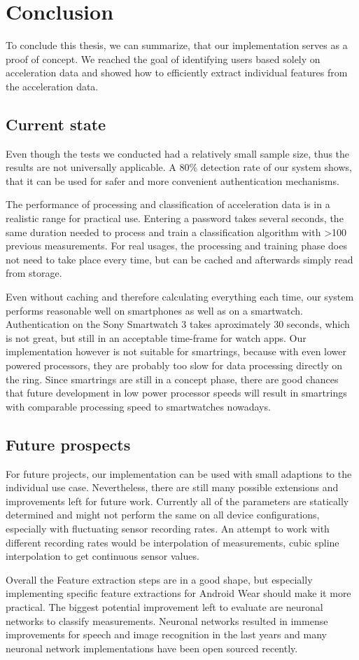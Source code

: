 \chapter{Conclusion}\label{chapter:conclusion}
To conclude this thesis, we can summarize, that our implementation serves as a proof of concept. We reached the goal of identifying users based solely on acceleration data and showed how to efficiently extract individual features from the acceleration data.

\section{Current state}
Even though the tests we conducted had a relatively small sample size, thus the results are not universally applicable. A 80\% detection rate of our system shows, that it can be used for safer and more convenient authentication mechanisms. %

The performance of processing and classification of acceleration data is in a realistic range for practical use. Entering a password takes several seconds, \ie the same duration needed to process and train a classification algorithm with >100 previous measurements. For real usages, the processing and training phase does not need to take place every time, but can be cached and afterwards simply read from storage.

Even without caching and therefore calculating everything each time, our system performs reasonable well on smartphones as well as on a smartwatch. Authentication on the Sony Smartwatch 3 takes aproximately 30 seconds, which is not great, but still in an acceptable time-frame for watch \glspl{app}. Our implementation however is not suitable for smartrings, because with even lower powered processors, they are probably too slow for data processing directly on the ring. Since smartrings are still in a concept phase, there are good chances that future development in low power processor speeds will result in smartrings with comparable processing speed to smartwatches nowadays.

\section{Future prospects}
For future projects, our implementation can be used with small adaptions to the individual use case. Nevertheless, there are still many possible extensions and improvements left for future work. Currently all of the parameters are statically determined and might not perform the same on all device configurations, especially with fluctuating sensor recording rates. An attempt to work with different recording rates would be interpolation of measurements, \eg cubic spline interpolation to get continuous sensor values.

Overall the Feature extraction steps are in a good shape, but especially implementing specific feature extractions for Android Wear should make it more practical. The biggest potential improvement left to evaluate are neuronal networks to classify measurements. Neuronal networks resulted in immense improvements for speech and image recognition in the last years and many neuronal network implementations have been open sourced recently.
